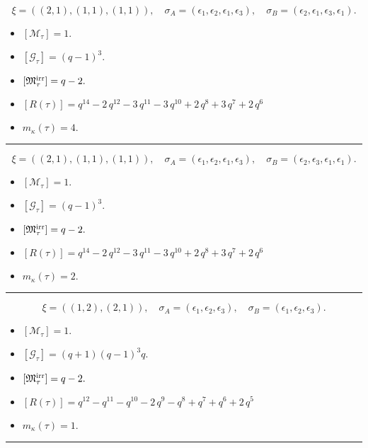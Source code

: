 \documentclass[10pt,a4paper]{amsart}
\begin{document}
$$\xi = ({(2, 1), (1, 1), (1, 1)}),\quad \sigma_A = ({{\epsilon_1, \epsilon_2}, {\epsilon_1}, {\epsilon_3}}),\quad \sigma_B = ({{\epsilon_2, \epsilon_1}, {\epsilon_3}, {\epsilon_1}}).$$

\begin{itemize}
 \item $[\mathcal{M}_{\tau}] = 1 .$

 \item $[\mathcal{G}_{\tau}] = {\left(q - 1\right)}^{3} .$

 \item $[{\frak M}_{\tau}^{\textrm{irr}}] = q - 2 .$

 \item $[R(\tau)] = q^{14} - 2 \, q^{12} - 3 \, q^{11} - 3 \, q^{10} + 2 \, q^{8} + 3 \, q^{7} + 2 \, q^{6} $

 \item $m_{\kappa}(\tau) = 4 .$

 \end{itemize}
\noindent\rule{8cm}{0.4pt}

$$\xi = ({(2, 1), (1, 1), (1, 1)}),\quad \sigma_A = ({{\epsilon_1, \epsilon_2}, {\epsilon_1}, {\epsilon_3}}),\quad \sigma_B = ({{\epsilon_2, \epsilon_3}, {\epsilon_1}, {\epsilon_1}}).$$

\begin{itemize}
 \item $[\mathcal{M}_{\tau}] = 1 .$

 \item $[\mathcal{G}_{\tau}] = {\left(q - 1\right)}^{3} .$

 \item $[{\frak M}_{\tau}^{\textrm{irr}}] = q - 2 .$

 \item $[R(\tau)] = q^{14} - 2 \, q^{12} - 3 \, q^{11} - 3 \, q^{10} + 2 \, q^{8} + 3 \, q^{7} + 2 \, q^{6} $

 \item $m_{\kappa}(\tau) = 2 .$

 \end{itemize}
\noindent\rule{8cm}{0.4pt}

$$\xi = ({(1, 2), (2, 1)}),\quad \sigma_A = ({{\epsilon_1}, {\epsilon_2, \epsilon_3}}),\quad \sigma_B = ({{\epsilon_1}, {\epsilon_2, \epsilon_3}}).$$

\begin{itemize}
 \item $[\mathcal{M}_{\tau}] = 1 .$

 \item $[\mathcal{G}_{\tau}] = {\left(q + 1\right)} {\left(q - 1\right)}^{3} q .$

 \item $[{\frak M}_{\tau}^{\textrm{irr}}] = q - 2 .$

 \item $[R(\tau)] = q^{12} - q^{11} - q^{10} - 2 \, q^{9} - q^{8} + q^{7} + q^{6} + 2 \, q^{5} $

 \item $m_{\kappa}(\tau) = 1 .$

 \end{itemize}
\noindent\rule{8cm}{0.4pt}
\end{document}
